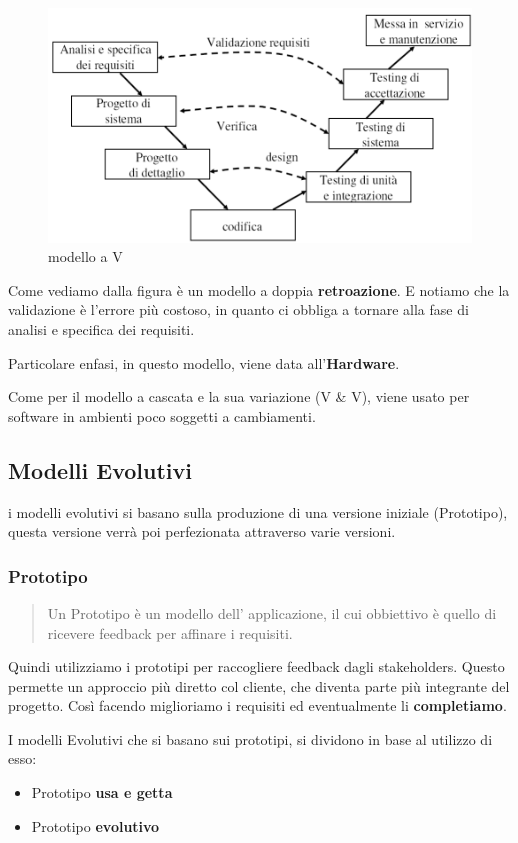\begin{figure}[htbp]
    \centering    
    \includegraphics[scale=0.5]{modello_a_v.PNG}
    \caption{modello a V}
    \label{fig:modello a v}
\end{figure}    
Come vediamo dalla figura \`e un modello a doppia \textbf{retroazione}.
E notiamo che la validazione \`e l'errore pi\`u costoso, in quanto ci obbliga a tornare alla fase di analisi e specifica 
dei requisiti.

Particolare enfasi, in questo modello, viene data all'\textbf{Hardware}.

Come per il modello a cascata e la sua variazione (V \& V), viene usato per software in ambienti
poco soggetti a cambiamenti.
\subsection{Modelli Evolutivi}
i modelli evolutivi si basano sulla produzione di una versione iniziale (Prototipo),
questa versione verr\`a poi perfezionata attraverso varie versioni.
\subsubsection*{Prototipo}
\begin{quote}
    Un Prototipo \`e un modello dell' applicazione, il cui obbiettivo \`e quello di  ricevere feedback
    per affinare i requisiti.
\end{quote}
Quindi utilizziamo i prototipi per raccogliere feedback dagli stakeholders.
Questo permette un approccio pi\`u diretto col cliente, che diventa parte pi\`u integrante del progetto.
Cos\`i facendo miglioriamo i requisiti ed eventualmente li \textbf{completiamo}.

I modelli Evolutivi che si basano sui prototipi, si dividono in base al utilizzo di esso:
\begin{itemize}
    \item Prototipo \textbf{usa e getta}
    \item Prototipo \textbf{evolutivo}
\end{itemize}
